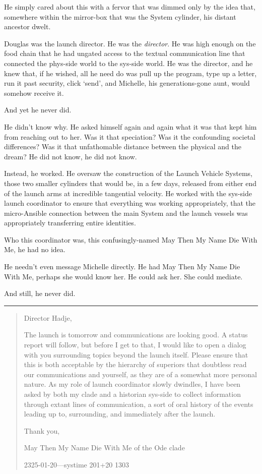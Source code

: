 He simply cared about this with a fervor that was dimmed only by the idea that, somewhere within the mirror-box that was the System cylinder, his distant ancestor dwelt.

Douglas was the launch director. He was the \emph{director}. He was high enough on the food chain that he had ungated access to the textual communication line that connected the phys-side world to the sys-side world. He was the director, and he knew that, if he wished, all he need do was pull up the program, type up a letter, run it past security, click `send', and Michelle, his generations-gone aunt, would somehow receive it.

And yet he never did.

He didn't know why. He asked himself again and again what it was that kept him from reaching out to her. Was it that speciation? Was it the confounding societal differences? Was it that unfathomable distance between the physical and the dream? He did not know, he did not know.

Instead, he worked. He oversaw the construction of the Launch Vehicle Systems, those two smaller cylinders that would be, in a few days, released from either end of the launch arms at incredible tangential velocity. He worked with the sys-side launch coordinator to ensure that everything was working appropriately, that the micro-Ansible connection between the main System and the launch vessels was appropriately transferring entire identities.

Who this coordinator was, this confusingly-named May Then My Name Die With Me, he had no idea.

He needn't even message Michelle directly. He had May Then My Name Die With Me, perhaps she would know her. He could ask her. She could mediate.

And still, he never did.

\begin{center}\rule{0.5\linewidth}{0.5pt}\end{center}

\begin{quote}
Director Hadje,

The launch is tomorrow and communications are looking good. A status report will follow, but before I get to that, I would like to open a dialog with you surrounding topics beyond the launch itself. Please ensure that this is both acceptable by the hierarchy of superiors that doubtless read our communications and yourself, as they are of a somewhat more personal nature. As my role of launch coordinator slowly dwindles, I have been asked by both my clade and a historian sys-side to collect information through extant lines of communication, a sort of oral history of the events leading up to, surrounding, and immediately after the launch.

Thank you,

May Then My Name Die With Me of the Ode clade

2325-01-20---systime 201+20 1303
\end{quote}

